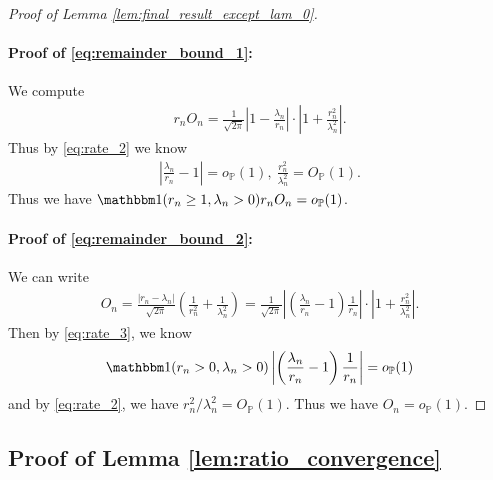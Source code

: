 \documentclass[12pt]{article}
\theoremstyle{definition}
\def\P{\mathbb{P}}
\def\P{\mathbb{P}}
\renewcommand{\P}{\mathbb{P}}							%
\newcommand{\indicator}{\mathbbm 1}						%
\begin{document}
\begin{proof}[Proof of Lemma \ref{lem:final_result_except_lam_0}]
	\paragraph{Proof of \eqref{eq:remainder_bound_1}:}

	We compute 
	\begin{align*}
		r_n O_n=\frac{1}{\sqrt{2\pi}}\left|1-\frac{\lambda_n}{r_n}\right|\cdot\left|1+\frac{r_n^2}{\lambda_n^2}\right|.
	\end{align*}
	Thus by \eqref{eq:rate_2} we know 
	\begin{align*}
		\left|\frac{\lambda_n}{r_n}-1\right|=o_{\P}(1),\ \frac{r_n^2}{\lambda_n^2}=O_{\P}(1).
	\end{align*}
	Thus we have $\indicator(r_n\geq 1,\lambda_n>0)r_n O_n=o_{\P}(1)$.

	\paragraph{Proof of \eqref{eq:remainder_bound_2}:}

	We can write 
	\begin{align*}
		O_n = \frac{|r_n-\lambda_n|}{\sqrt{2\pi}}\left(\frac{1}{r_n^2}+\frac{1}{\lambda_n^2}\right)=\frac{1}{\sqrt{2\pi}}\left|\left(\frac{\lambda_n}{r_n}-1\right)\frac{1}{r_n}\right|\cdot\left|1+\frac{r_n^2}{\lambda_n^2}\right|.
	\end{align*}
	Then by \eqref{eq:rate_3}, we know 
	\begin{align*}
		\indicator(r_n>0,\lambda_n>0)\left|\left(\frac{\lambda_n}{r_n}-1\right)\frac{1}{r_n}\right|=o_{\P}(1)
	\end{align*}
	and by \eqref{eq:rate_2}, we have $r_n^2/\lambda_n^2=O_{\P}(1)$. Thus we have $O_n=o_{\P}(1)$.
	\end{proof}



\subsection{Proof of Lemma \ref{lem:ratio_convergence}}
\end{document}
